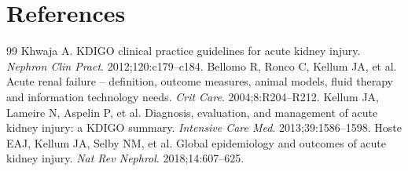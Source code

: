 \section*{References}
\begin{thebibliography}{99}
 Khwaja A. KDIGO clinical practice guidelines for acute kidney injury. \textit{Nephron Clin Pract}. 2012;120:c179--c184.
 Bellomo R, Ronco C, Kellum JA, et al. Acute renal failure -- definition, outcome measures, animal models, fluid therapy and information technology needs. \textit{Crit Care}. 2004;8:R204--R212.
 Kellum JA, Lameire N, Aspelin P, et al. Diagnosis, evaluation, and management of acute kidney injury: a KDIGO summary. \textit{Intensive Care Med}. 2013;39:1586--1598.
 Hoste EAJ, Kellum JA, Selby NM, et al. Global epidemiology and outcomes of acute kidney injury. \textit{Nat Rev Nephrol}. 2018;14:607--625.
\end{thebibliography}
